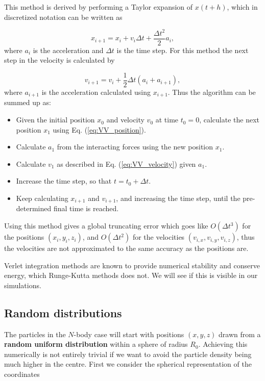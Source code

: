 \documentclass{article}
\begin{document}
\begin{multicols}{2}
This method is derived by performing a Taylor expansion of $x(t+h)$, which in discretized notation can be written as

\begin{equation}\label{eq:VV_position}
	x_{i+1} = x_i + v_i \Delta t + \frac{\Delta t^2}{2}a_i,
\end{equation}
where $a_i$ is the acceleration and $\Delta t$ is the time step. For this method the next step in the velocity is calculated by

\begin{equation}\label{eq:VV_velocity}
	v_{i+1} = v_i + \frac{1}{2}\Delta t (a_i + a_{i+1}),
\end{equation}
where $a_{i+1}$ is the acceleration calculated using $x_{i+1}$. Thus the algorithm can be summed up as:

\begin{itemize}
	\item Given the initial position $x_0$ and velocity $v_0$ at time $t_0 = 0$, calculate the next position $x_1$ using Eq. (\ref{eq:VV_position}).
	\item Calculate $a_1$ from the interacting forces using the new position $x_1$.
	\item Calculate $v_1$ as described in Eq. (\ref{eq:VV_velocity}) given $a_1$.
	\item Increase the time step, so that $t = t_0 + \Delta t$. 
	\item Keep calculating $x_{i+1}$ and $v_{i+1}$, and increasing the time step, until the pre-determined final time is reached.
\end{itemize}
Using this method gives a global truncating error which goes like $O(\Delta t^3)$ for the positions $(x_i,y_i,z_i)$, and $O(\Delta t^2)$ for the velocities $(v_{i,x},v_{i,y},v_{i,z})$, thus the velocities are not approximated to the same accuracy as the positions are. 

Verlet integration methods are known to provide numerical stability and conserve energy, which Runge-Kutta methods does not. We will see if this is visible in our simulations.




\subsection{Random distributions}
The particles in the $N$-body case will start with positions $(x,y,z)$ drawn from a \textbf{random uniform distribution} within a sphere of radius $R_0$. Achieving this numerically is not entirely trivial if we want to avoid the particle density being much higher in the centre. First we consider the spherical representation of the coordinates


\end{multicols}
\end{document}
